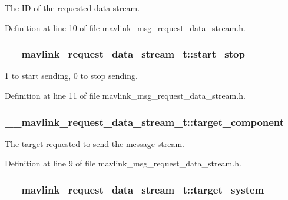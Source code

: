 The I\-D of the requested data stream. 



Definition at line 10 of file mavlink\-\_\-msg\-\_\-request\-\_\-data\-\_\-stream.\-h.

\hypertarget{struct____mavlink__request__data__stream__t_aca2ea67e9e22299721f98ea586d78f07}{
\subsubsection[{start\-\_\-stop}]{ \-\_\-\-\_\-mavlink\-\_\-request\-\_\-data\-\_\-stream\-\_\-t\-::start\-\_\-stop}}\label{struct____mavlink__request__data__stream__t_aca2ea67e9e22299721f98ea586d78f07}


1 to start sending, 0 to stop sending. 



Definition at line 11 of file mavlink\-\_\-msg\-\_\-request\-\_\-data\-\_\-stream.\-h.

\hypertarget{struct____mavlink__request__data__stream__t_aab4483f29d41d2e72070bd4295e1395f}{
\subsubsection[{target\-\_\-component}]{ \-\_\-\-\_\-mavlink\-\_\-request\-\_\-data\-\_\-stream\-\_\-t\-::target\-\_\-component}}\label{struct____mavlink__request__data__stream__t_aab4483f29d41d2e72070bd4295e1395f}


The target requested to send the message stream. 



Definition at line 9 of file mavlink\-\_\-msg\-\_\-request\-\_\-data\-\_\-stream.\-h.

\hypertarget{struct____mavlink__request__data__stream__t_ad18b3be12f7ec2056677acd15c286d0a}{
\subsubsection[{target\-\_\-system}]{ \-\_\-\-\_\-mavlink\-\_\-request\-\_\-data\-\_\-stream\-\_\-t\-::target\-\_\-system}}\label{struct____mavlink__request__data__stream__t_ad18b3be12f7ec2056677acd15c286d0a}


